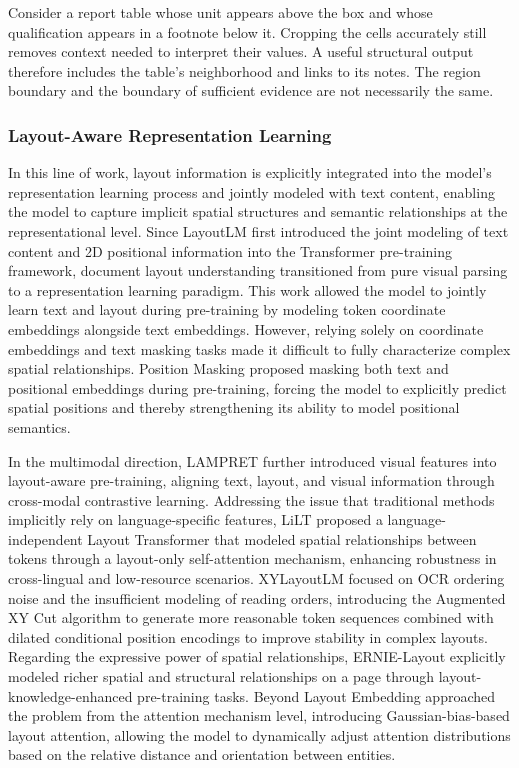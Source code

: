 Consider a report table whose unit appears above the box and whose qualification appears in a footnote below it. Cropping the cells accurately still removes context needed to interpret their values. A useful structural output therefore includes the table's neighborhood and links to its notes. The region boundary and the boundary of sufficient evidence are not necessarily the same.

\subsubsection{Layout-Aware Representation Learning}

In this line of work, layout information is explicitly integrated into the model’s representation learning process and jointly modeled with text content, enabling the model to capture implicit spatial structures and semantic relationships at the representational level. Since LayoutLM \cite{xu2019layoutlm} first introduced the joint modeling of text content and 2D positional information into the Transformer pre-training framework, document layout understanding transitioned from pure visual parsing to a representation learning paradigm. This work allowed the model to jointly learn text and layout during pre-training by modeling token coordinate embeddings alongside text embeddings. However, relying solely on coordinate embeddings and text masking tasks made it difficult to fully characterize complex spatial relationships. Position Masking \cite{saha2021position} proposed masking both text and positional embeddings during pre-training, forcing the model to explicitly predict spatial positions and thereby strengthening its ability to model positional semantics.

In the multimodal direction, LAMPRET \cite{wu2021lampret} further introduced visual features into layout-aware pre-training, aligning text, layout, and visual information through cross-modal contrastive learning. Addressing the issue that traditional methods implicitly rely on language-specific features, LiLT \cite{wang2022lilt} proposed a language-independent Layout Transformer that modeled spatial relationships between tokens through a layout-only self-attention mechanism, enhancing robustness in cross-lingual and low-resource scenarios. XYLayoutLM \cite{gu2022xylayoutlm} focused on OCR ordering noise and the insufficient modeling of reading orders, introducing the Augmented XY Cut algorithm to generate more reasonable token sequences combined with dilated conditional position encodings to improve stability in complex layouts. Regarding the expressive power of spatial relationships, ERNIE-Layout \cite{peng2022ernie_layout} explicitly modeled richer spatial and structural relationships on a page through layout-knowledge-enhanced pre-training tasks. Beyond Layout Embedding \cite{zhu2023beyond_layout} approached the problem from the attention mechanism level, introducing Gaussian-bias-based layout attention, allowing the model to dynamically adjust attention distributions based on the relative distance and orientation between entities.

